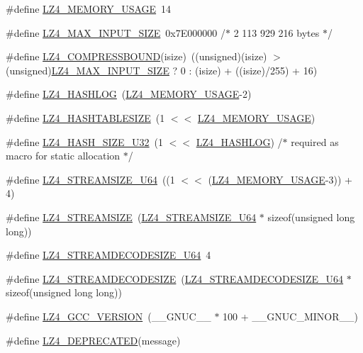 \begin{DoxyCompactItemize}
\item 
\#define \hyperlink{compat-lz4_8h_a24ddbc39e7379532031a91357e66a32c}{L\+Z4\+\_\+\+M\+E\+M\+O\+R\+Y\+\_\+\+U\+S\+A\+G\+E}~14
\item 
\#define \hyperlink{compat-lz4_8h_a88ee51e36ca74cd0533e731c20572ea6}{L\+Z4\+\_\+\+M\+A\+X\+\_\+\+I\+N\+P\+U\+T\+\_\+\+S\+I\+Z\+E}~0x7\+E000000   /$\ast$ 2 113 929 216 bytes $\ast$/
\item 
\#define \hyperlink{compat-lz4_8h_a2453a423fd34640a0afbbf57ed0a5399}{L\+Z4\+\_\+\+C\+O\+M\+P\+R\+E\+S\+S\+B\+O\+U\+N\+D}(isize)~((unsigned)(isize) $>$ (unsigned)\hyperlink{compat-lz4_8h_a88ee51e36ca74cd0533e731c20572ea6}{L\+Z4\+\_\+\+M\+A\+X\+\_\+\+I\+N\+P\+U\+T\+\_\+\+S\+I\+Z\+E} ? 0 \+: (isize) + ((isize)/255) + 16)
\item 
\#define \hyperlink{compat-lz4_8h_ac7f04539d94ce57826ef8b2f3d8408af}{L\+Z4\+\_\+\+H\+A\+S\+H\+L\+O\+G}~(\hyperlink{compat-lz4_8h_a24ddbc39e7379532031a91357e66a32c}{L\+Z4\+\_\+\+M\+E\+M\+O\+R\+Y\+\_\+\+U\+S\+A\+G\+E}-\/2)
\item 
\#define \hyperlink{compat-lz4_8h_a1bb7a0fa34be27b67f43ce30be0fc905}{L\+Z4\+\_\+\+H\+A\+S\+H\+T\+A\+B\+L\+E\+S\+I\+Z\+E}~(1 $<$$<$ \hyperlink{compat-lz4_8h_a24ddbc39e7379532031a91357e66a32c}{L\+Z4\+\_\+\+M\+E\+M\+O\+R\+Y\+\_\+\+U\+S\+A\+G\+E})
\item 
\#define \hyperlink{compat-lz4_8h_a75fa199d8ad0949f67b62054171dc473}{L\+Z4\+\_\+\+H\+A\+S\+H\+\_\+\+S\+I\+Z\+E\+\_\+\+U32}~(1 $<$$<$ \hyperlink{compat-lz4_8h_ac7f04539d94ce57826ef8b2f3d8408af}{L\+Z4\+\_\+\+H\+A\+S\+H\+L\+O\+G})       /$\ast$ required as macro for static allocation $\ast$/
\item 
\#define \hyperlink{compat-lz4_8h_acddbce79f3e1d413f295e97d986ab3f5}{L\+Z4\+\_\+\+S\+T\+R\+E\+A\+M\+S\+I\+Z\+E\+\_\+\+U64}~((1 $<$$<$ (\hyperlink{compat-lz4_8h_a24ddbc39e7379532031a91357e66a32c}{L\+Z4\+\_\+\+M\+E\+M\+O\+R\+Y\+\_\+\+U\+S\+A\+G\+E}-\/3)) + 4)
\item 
\#define \hyperlink{compat-lz4_8h_a1b76402ebadac569ceb550cb22a7a6e4}{L\+Z4\+\_\+\+S\+T\+R\+E\+A\+M\+S\+I\+Z\+E}~(\hyperlink{compat-lz4_8h_acddbce79f3e1d413f295e97d986ab3f5}{L\+Z4\+\_\+\+S\+T\+R\+E\+A\+M\+S\+I\+Z\+E\+\_\+\+U64} $\ast$ sizeof(unsigned long long))
\item 
\#define \hyperlink{compat-lz4_8h_a414ecb38e0607f239de5ebca5a5beef5}{L\+Z4\+\_\+\+S\+T\+R\+E\+A\+M\+D\+E\+C\+O\+D\+E\+S\+I\+Z\+E\+\_\+\+U64}~4
\item 
\#define \hyperlink{compat-lz4_8h_a9a08f1c4969b5e46eba93818cd7cb5a7}{L\+Z4\+\_\+\+S\+T\+R\+E\+A\+M\+D\+E\+C\+O\+D\+E\+S\+I\+Z\+E}~(\hyperlink{compat-lz4_8h_a414ecb38e0607f239de5ebca5a5beef5}{L\+Z4\+\_\+\+S\+T\+R\+E\+A\+M\+D\+E\+C\+O\+D\+E\+S\+I\+Z\+E\+\_\+\+U64} $\ast$ sizeof(unsigned long long))
\item 
\#define \hyperlink{compat-lz4_8h_ad592c1aaee404bea7bc9db64a0addcfd}{L\+Z4\+\_\+\+G\+C\+C\+\_\+\+V\+E\+R\+S\+I\+O\+N}~(\+\_\+\+\_\+\+G\+N\+U\+C\+\_\+\+\_\+ $\ast$ 100 + \+\_\+\+\_\+\+G\+N\+U\+C\+\_\+\+M\+I\+N\+O\+R\+\_\+\+\_\+)
\item 
\#define \hyperlink{compat-lz4_8h_afa2a2c9dbd9d88448d70c8fff093782b}{L\+Z4\+\_\+\+D\+E\+P\+R\+E\+C\+A\+T\+E\+D}(message)
\end{DoxyCompactItemize}
